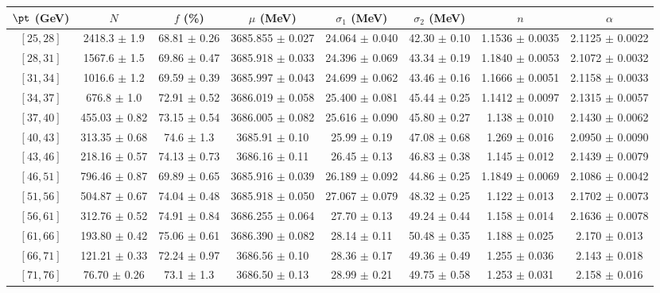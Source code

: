 \begin{tabular}{c||c|c|c|c|c|c|c}
$\pt$ (GeV) & $N$ & $f$ (\%) & $\mu$ (MeV) & $\sigma_1$ (MeV) & $\sigma_2$ (MeV) & $n$ & $\alpha$ \\
\hline
$[25, 28]$ & 2418.3 $\pm$ 1.9 & 68.81 $\pm$ 0.26 & 3685.855 $\pm$ 0.027 & 24.064 $\pm$ 0.040 & 42.30 $\pm$ 0.10 & 1.1536 $\pm$ 0.0035 & 2.1125 $\pm$ 0.0022\\
$[28, 31]$ & 1567.6 $\pm$ 1.5 & 69.86 $\pm$ 0.47 & 3685.918 $\pm$ 0.033 & 24.396 $\pm$ 0.069 & 43.34 $\pm$ 0.19 & 1.1840 $\pm$ 0.0053 & 2.1072 $\pm$ 0.0032\\
$[31, 34]$ & 1016.6 $\pm$ 1.2 & 69.59 $\pm$ 0.39 & 3685.997 $\pm$ 0.043 & 24.699 $\pm$ 0.062 & 43.46 $\pm$ 0.16 & 1.1666 $\pm$ 0.0051 & 2.1158 $\pm$ 0.0033\\
$[34, 37]$ & 676.8 $\pm$ 1.0 & 72.91 $\pm$ 0.52 & 3686.019 $\pm$ 0.058 & 25.400 $\pm$ 0.081 & 45.44 $\pm$ 0.25 & 1.1412 $\pm$ 0.0097 & 2.1315 $\pm$ 0.0057\\
$[37, 40]$ & 455.03 $\pm$ 0.82 & 73.15 $\pm$ 0.54 & 3686.005 $\pm$ 0.082 & 25.616 $\pm$ 0.090 & 45.80 $\pm$ 0.27 & 1.138 $\pm$ 0.010 & 2.1430 $\pm$ 0.0062\\
$[40, 43]$ & 313.35 $\pm$ 0.68 & 74.6 $\pm$ 1.3 & 3685.91 $\pm$ 0.10 & 25.99 $\pm$ 0.19 & 47.08 $\pm$ 0.68 & 1.269 $\pm$ 0.016 & 2.0950 $\pm$ 0.0090\\
$[43, 46]$ & 218.16 $\pm$ 0.57 & 74.13 $\pm$ 0.73 & 3686.16 $\pm$ 0.11 & 26.45 $\pm$ 0.13 & 46.83 $\pm$ 0.38 & 1.145 $\pm$ 0.012 & 2.1439 $\pm$ 0.0079\\
$[46, 51]$ & 796.46 $\pm$ 0.87 & 69.89 $\pm$ 0.65 & 3685.916 $\pm$ 0.039 & 26.189 $\pm$ 0.092 & 44.86 $\pm$ 0.25 & 1.1849 $\pm$ 0.0069 & 2.1086 $\pm$ 0.0042\\
$[51, 56]$ & 504.87 $\pm$ 0.67 & 74.04 $\pm$ 0.48 & 3685.918 $\pm$ 0.050 & 27.067 $\pm$ 0.079 & 48.32 $\pm$ 0.25 & 1.122 $\pm$ 0.013 & 2.1702 $\pm$ 0.0073\\
$[56, 61]$ & 312.76 $\pm$ 0.52 & 74.91 $\pm$ 0.84 & 3686.255 $\pm$ 0.064 & 27.70 $\pm$ 0.13 & 49.24 $\pm$ 0.44 & 1.158 $\pm$ 0.014 & 2.1636 $\pm$ 0.0078\\
$[61, 66]$ & 193.80 $\pm$ 0.42 & 75.06 $\pm$ 0.61 & 3686.390 $\pm$ 0.082 & 28.14 $\pm$ 0.11 & 50.48 $\pm$ 0.35 & 1.188 $\pm$ 0.025 & 2.170 $\pm$ 0.013\\
$[66, 71]$ & 121.21 $\pm$ 0.33 & 72.24 $\pm$ 0.97 & 3686.56 $\pm$ 0.10 & 28.36 $\pm$ 0.17 & 49.36 $\pm$ 0.49 & 1.255 $\pm$ 0.036 & 2.143 $\pm$ 0.018\\
$[71, 76]$ & 76.70 $\pm$ 0.26 & 73.1 $\pm$ 1.3 & 3686.50 $\pm$ 0.13 & 28.99 $\pm$ 0.21 & 49.75 $\pm$ 0.58 & 1.253 $\pm$ 0.031 & 2.158 $\pm$ 0.016\\

\end{tabular}
